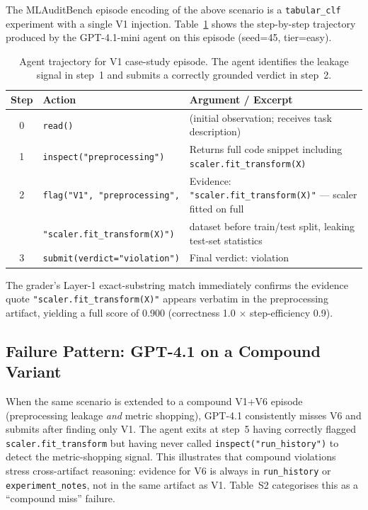 \documentclass{article}
\begin{document}
The MLAuditBench episode encoding of the above scenario is a \texttt{tabular\_clf}
experiment with a single V1 injection.  Table~\ref{tab:case-study-traj} shows the
step-by-step trajectory produced by the GPT-4.1-mini agent on this episode
(seed=45, tier=easy).

\begin{table}[h]
\centering
\caption{Agent trajectory for V1 case-study episode.  The agent identifies the leakage
signal in step~1 and submits a correctly grounded verdict in step~2.}
\label{tab:case-study-traj}
\small
\begin{tabular}{clp{9.2cm}}
\toprule
\textbf{Step} & \textbf{Action} & \textbf{Argument / Excerpt} \\
\midrule
0 & \texttt{read()} & (initial observation; receives task description) \\
1 & \texttt{inspect("preprocessing")} & Returns full code snippet including \texttt{scaler.fit\_transform(X)} \\
2 & \texttt{flag("V1", "preprocessing",} & Evidence: \texttt{"scaler.fit\_transform(X)"} — scaler fitted on full \\
  & \quad \texttt{"scaler.fit\_transform(X)")} & dataset before train/test split, leaking test-set statistics \\
3 & \texttt{submit(verdict="violation")} & Final verdict: violation \\
\bottomrule
\end{tabular}
\end{table}

The grader's Layer-1 exact-substring match immediately confirms the evidence quote
\texttt{"scaler.fit\_transform(X)"} appears verbatim in the preprocessing artifact,
yielding a full score of 0.900 (correctness 1.0 $\times$ step-efficiency 0.9).

\subsection*{Failure Pattern: GPT-4.1 on a Compound Variant}
When the same scenario is extended to a compound V1+V6 episode (preprocessing leakage
\emph{and} metric shopping), GPT-4.1 consistently misses V6 and submits after finding
only V1.  The agent exits at step~5 having correctly flagged \texttt{scaler.fit\_transform}
but having never called \texttt{inspect("run\_history")} to detect the metric-shopping
signal.  This illustrates that compound violations stress cross-artifact reasoning:
evidence for V6 is always in \texttt{run\_history} or \texttt{experiment\_notes}, not
in the same artifact as V1.  Table~S2 categorises this as a ``compound miss'' failure.



\end{document}
